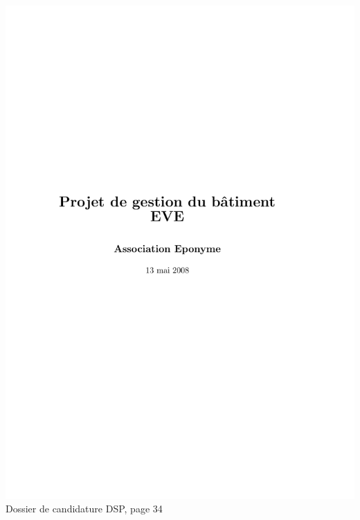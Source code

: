 \includegraphics[scale=0.85,trim=20mm 20mm 20mm 20mm,clip,page=34]{annexes/candidature_dsp.pdf} \\
Dossier de candidature DSP, page 34
\newpage
